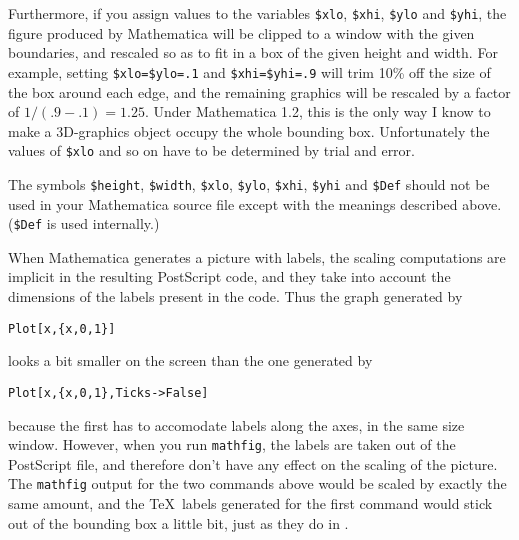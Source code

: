\begin{wizard}
Furthermore, if you assign values to the variables \verb+$xlo+,
\verb+$xhi+, \verb+$ylo+ and \verb+$yhi+, the figure produced by
Mathematica will be clipped to a window with the given boundaries, and
rescaled so as to fit in a box of the given height and width.  For
example, setting \verb+$xlo=$ylo=.1+ and \verb+$xhi=$yhi=.9+ will trim
10\% off the size of the box around each edge, and the remaining
graphics will be rescaled by a factor of $1/(.9-.1)=1.25$.  Under
Mathematica 1.2, this is the only way I know to make a 3D-graphics
object occupy the whole bounding box.  Unfortunately the values of
\verb+$xlo+ and so on have to be determined by trial and error.

The symbols \verb+$height+, \verb+$width+, \verb+$xlo+, \verb=$ylo=,
\verb+$xhi+, \verb=$yhi= and \verb=$Def= should not be used in your
Mathematica source file except with the meanings described above.
(\verb=$Def= is used internally.)

When Mathematica generates a picture with labels, the scaling
computations are implicit in the resulting PostScript code, and they
take into account the dimensions of the labels present in the code.
Thus the graph generated by
%
\begin{verbatim}
Plot[x,{x,0,1}]
\end{verbatim}
%
looks a bit smaller on the screen than the one generated by
%
\begin{verbatim}
Plot[x,{x,0,1},Ticks->False]
\end{verbatim}
%
because the first has to accomodate labels along the axes, in the same
size window.  However, when you run \verb+mathfig+, the labels are
taken out of the PostScript file, and therefore don't have any effect
on the scaling of the picture.  The \verb+mathfig+ output for the two
commands above would be scaled by exactly the same amount, and the
\TeX\ labels generated for the first command would stick out of the
bounding box a little bit, just as they do in .
\end{wizard}



\vfil\eject

\begin{theindex}
\end{theindex}



%
%
%
%
%
%
%
%
%
%
%
%

